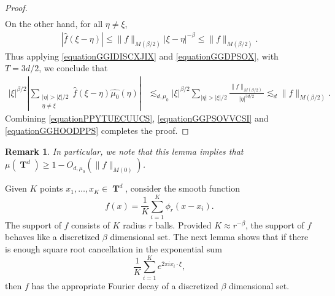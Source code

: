 \documentclass[12pt,reqno]{article}
\numberwithin{equation}{section}
\DeclareMathOperator{\TT}{\mathbf{T}}
\newtheorem{remark}{Remark}
\begin{document}
\begin{proof}
\begin{equation}
\begin{split}
    \end{split}
    \end{equation}
    On the other hand, for all $\eta \neq \xi$,
    \begin{equation} \label{equationGGDPSOX}
    \begin{split}
        |\widehat{f}(\xi - \eta)| \leq  \| f \|_{M(\beta/2)} |\xi - \eta|^{-\beta} \leq \| f \|_{M(\beta/2)}.
    \end{split}
    \end{equation}
    Thus applying \eqref{equationGGIDISCXJIX} and \eqref{equationGGDPSOX}, with $T = 3d/2$, we conclude that
    \begin{equation} \label{equationGGHOODPPS}
    \begin{split}
        |\xi|^{\beta/2} \left| \sum_{\substack{|\eta| > |\xi|/2\\ \eta \neq \xi}} \widehat{f}(\xi - \eta) \widehat{\mu_0}(\eta) \right| &\lesssim_{d,\mu_0} |\xi|^{\beta/2} \sum_{|\eta| > |\xi|/2} \frac{\| f \|_{M(\beta/2)}}{|\eta|^{3d/2}} \lesssim_d \| f \|_{M(\beta/2)}.
    \end{split}
    \end{equation}
    Combining \eqref{equationPPYTUECUUCS}, \eqref{equationGGPSOVVCSI} and \eqref{equationGGHOODPPS} completes the proof.
\end{proof}

\begin{remark} \label{remarkFOIJIOSJCIOSJ}
    In particular, we note that this lemma implies that $\mu(\TT^d) \geq 1 - O_{d,\mu_0}(\| f \|_{M(0)})$.
\end{remark}

Given $K$ points $x_1,\dots,x_K \in \TT^d$, consider the smooth function
%
\[ f(x) = \frac{1}{K} \sum_{i = 1}^K \phi_r(x - x_i). \]
%
The support of $f$ consists of $K$ radius $r$ balls. Provided $K \approx r^{-\beta}$, the support of $f$ behaves like a discretized $\beta$ dimensional set. The next lemma shows that if there is enough square root cancellation in the exponential sum
%
\[ \frac{1}{K} \sum_{i = 1}^K e^{2 \pi i x_i \cdot \xi}, \]
%
then $f$ has the appropriate Fourier decay of a discretized $\beta$ dimensional set.
\end{document}
